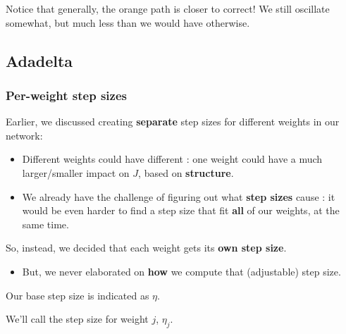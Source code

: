             Notice that generally, the orange path is closer to correct! We still oscillate somewhat, but much less than we would have otherwise.

            \pagebreak

            
            

            

    \subsection{Adadelta}    

        \subsubsection{Per-weight step sizes}

            Earlier, we discussed creating \textbf{separate} step sizes for different weights in our network:
    
            \begin{itemize}
                \item Different weights could have different : one weight could have a much larger/smaller impact on $J$, based on \textbf{structure}.
    
                \item We already have the challenge of figuring out what \textbf{step sizes} cause : it would be even harder to find a step size that fit \textbf{all} of our weights, at the same time.
            \end{itemize}
    
            So, instead, we decided that each weight gets its \textbf{own step size}. 

            \begin{itemize}
                \item But, we never elaborated on \textbf{how} we compute that (adjustable) step size.\\
            \end{itemize}

            \begin{notation}
                Our base step size is indicated as $\eta$. 
                
                We'll call the  step size for weight $j$, $\eta_j$.
            \end{notation}

        \phantom{}

